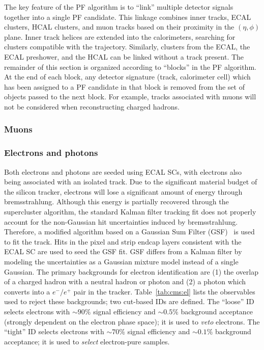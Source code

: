 The key feature of the PF algorithm is to ``link'' multiple detector signals together into a single PF candidate.
This linkage combines inner tracks, ECAL clusters, HCAL clusters, and muon tracks based on their proximity in the $(\eta,\phi)$ plane.
Inner track helices are extended into the calorimeters, searching for clusters compatible with the trajectory.
Similarly, clusters from the ECAL, the ECAL preshower, and the HCAL can be linked without a track present. 
The remainder of this section is organized according to ``blocks'' in the PF algorithm.
At the end of each block, any detector signature (track, calorimeter cell) which has been assigned to a PF candidate in that block is removed from the set of objects passed to the next block.
For example, tracks associated with muons will not be considered when reconstructing charged hadrons. 

\subsubsection{Muons}


\subsubsection{Electrons and photons}

Both electrons and photons are seeded using ECAL SCs, with electrons also being associated with an isolated track.
Due to the significant material budget of the silicon tracker, electrons will lose a significant amount of energy through bremsstrahlung.
Although this energy is partially recovered through the supercluster algorithm, the standard Kalman filter tracking fit does not properly account for the non-Gaussian hit uncertainties induced by bremsstrahlung.
Therefore, a modified algorithm based on a Gaussian Sum Filter (GSF)~\cite{cmstracker,gsf} is used to fit the track.
Hits in the pixel and strip endcap layers consistent with the ECAL SC are used to seed the GSF fit.
GSF differs from a Kalman filter by modeling the uncertainties as a Gaussian mixture model instead of a single Gaussian.
The primary backgrounds for electron identification are (1) the overlap of a charged hadron with a neutral hadron or photon and (2) a photon which converts into a $e^-/e^+$ pair in the tracker.
Table~\ref{tab:cms:el} lists the observables used to reject these backgrounds; two cut-based IDs are defined.
The ``loose'' ID selects electrons with $\sim90\%$ signal efficiency and $\sim0.5\%$ background acceptance (strongly dependent on the electron phase space); it is used to \emph{veto} electrons. 
The ``tight'' ID selects electrons with $\sim70\%$ signal efficiency and $\sim0.1\%$ background acceptance; it is used to \emph{select} electron-pure samples. 

